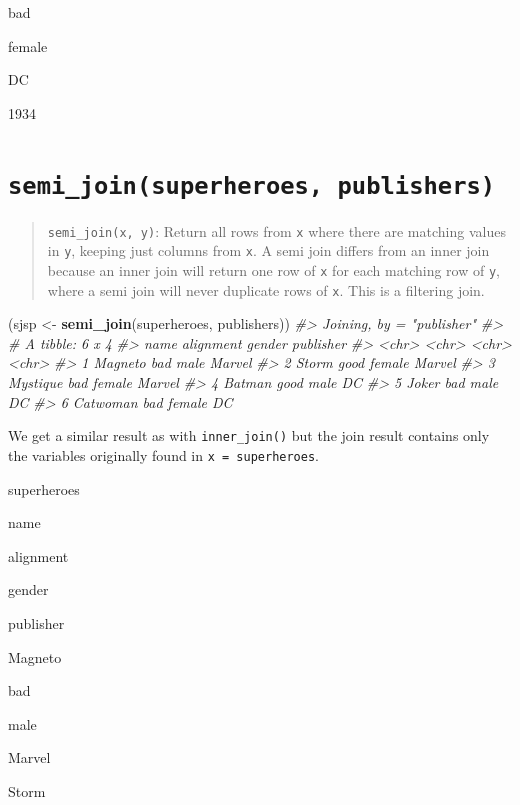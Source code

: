\documentclass[
]{book}
\newenvironment{Shaded}{\begin{snugshade}}{\end{snugshade}}
\newcommand{\CommentTok}[1]{\textcolor[rgb]{0.56,0.35,0.01}{\textit{#1}}}
\newcommand{\KeywordTok}[1]{\textcolor[rgb]{0.13,0.29,0.53}{\textbf{#1}}}
\newcommand{\NormalTok}[1]{#1}
\newcommand{\StringTok}[1]{\textcolor[rgb]{0.31,0.60,0.02}{#1}}
\begin{document}
bad

female

DC

1934

\hypertarget{semi_joinsuperheroes-publishers}{%
\section{\texorpdfstring{\texttt{semi\_join(superheroes,\ publishers)}}{semi\_join(superheroes, publishers)}}\label{semi_joinsuperheroes-publishers}}

\begin{quote}
\texttt{semi\_join(x,\ y)}: Return all rows from \texttt{x} where there are matching values in \texttt{y}, keeping just columns from \texttt{x}. A semi join differs from an inner join because an inner join will return one row of \texttt{x} for each matching row of \texttt{y}, where a semi join will never duplicate rows of \texttt{x}. This is a filtering join.
\end{quote}

\begin{Shaded}
\begin{Highlighting}[]
\NormalTok{(sjsp <-}\StringTok{ }\KeywordTok{semi_join}\NormalTok{(superheroes, publishers))}
\CommentTok{#> Joining, by = "publisher"}
\CommentTok{#> # A tibble: 6 x 4}
\CommentTok{#>   name     alignment gender publisher}
\CommentTok{#>   <chr>    <chr>     <chr>  <chr>    }
\CommentTok{#> 1 Magneto  bad       male   Marvel   }
\CommentTok{#> 2 Storm    good      female Marvel   }
\CommentTok{#> 3 Mystique bad       female Marvel   }
\CommentTok{#> 4 Batman   good      male   DC       }
\CommentTok{#> 5 Joker    bad       male   DC       }
\CommentTok{#> 6 Catwoman bad       female DC}
\end{Highlighting}
\end{Shaded}

We get a similar result as with \texttt{inner\_join()} but the join result contains only the variables originally found in \texttt{x\ =\ superheroes}.

superheroes

name

alignment

gender

publisher

Magneto

bad

male

Marvel

Storm
\end{document}
